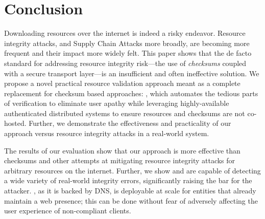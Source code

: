 \section{Conclusion} \label{sec:conclusion}

Downloading resources over the internet is indeed a risky endeavor. Resource
integrity attacks, and Supply Chain Attacks more broadly, are becoming more
frequent and their impact more widely felt. This paper shows that the de facto
standard for addressing resource integrity risk---the use of \emph{checksums}
coupled with a secure transport layer---is an insufficient and often ineffective
solution. We propose a novel practical resource validation approach meant as a
complete replacement for checksum based approaches: \SYSTEM{}, which automates
the tedious parts of verification to eliminate user apathy while leveraging
highly-available authenticated distributed systems to ensure resources and
checksums are not co-hosted. Further, we demonstrate the effectiveness and
practicality of our approach versus resource integrity attacks in a real-world
system.

The results of our evaluation show that our approach is more effective than
checksums and other attempts at mitigating resource integrity attacks for
arbitrary resources on the internet. Further, we show \DNSSYS{} and \DHTSYS{}
are capable of detecting a wide variety of real-world integrity errors,
significantly raising the bar for the attacker. \DNSSYS{}, as it is backed by
DNS, is deployable at scale for entities that already maintain a web presence;
this can be done without fear of adversely affecting the user experience of
non-compliant clients.
